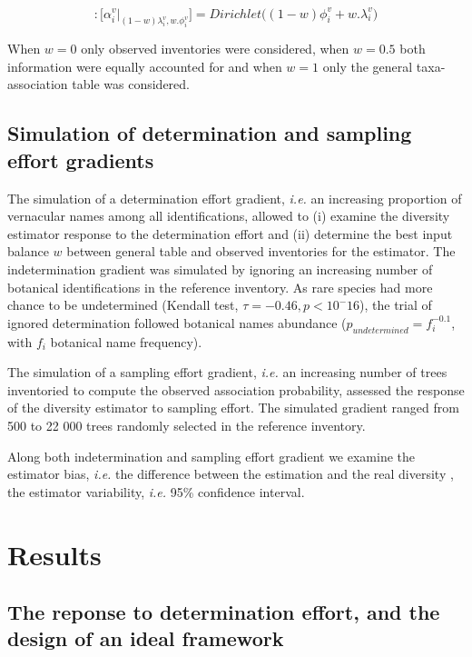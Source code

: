 \documentclass[fleqn,10pt]{ArtEcoFoG} %
\begin{document}
\begin{equation}
[\alpha_i^v]: 
\Big[\alpha_i^v | _{(1-w)\lambda_i^v ,w.\phi_i^v}\Big] =Dirichlet\Big((1-w)\phi_i^v+w.\lambda_i^v\Big)
\label{eq:weighting}
\end{equation}

When \(w=0\) only observed inventories were considered, when \(w=0.5\)
both information were equally accounted for and when \(w=1\) only the
general taxa-association table was considered.

\subsection{Simulation of determination and sampling effort
gradients}\label{simulation-of-determination-and-sampling-effort-gradients}

The simulation of a determination effort gradient, \emph{i.e.} an
increasing proportion of vernacular names among all identifications,
allowed to (i) examine the diversity estimator response to the
determination effort and (ii) determine the best input balance \(w\)
between general table and observed inventories for the estimator. The
indetermination gradient was simulated by ignoring an increasing number
of botanical identifications in the reference inventory. As rare species
had more chance to be undetermined (Kendall test,
\(\tau = -0.46, p < 10^-16\)), the trial of ignored determination
followed botanical names abundance (\(p_{undetermined}=f_i^{-0.1}\),
with \(f_i\) botanical name frequency).

The simulation of a sampling effort gradient, \emph{i.e.} an increasing
number of trees inventoried to compute the observed association
probability, assessed the response of the diversity estimator to
sampling effort. The simulated gradient ranged from 500 to 22 000 trees
randomly selected in the reference inventory.

Along both indetermination and sampling effort gradient we examine the
estimator bias, \emph{i.e.} the difference between the estimation and
the real diversity \citep{Baltanas2009}, the estimator variability,
\emph{i.e.} 95\% confidence interval.

\section{Results}\label{results}

\subsection{The reponse to determination effort, and the design of an
ideal
framework}\label{the-reponse-to-determination-effort-and-the-design-of-an-ideal-framework}
\end{document}
